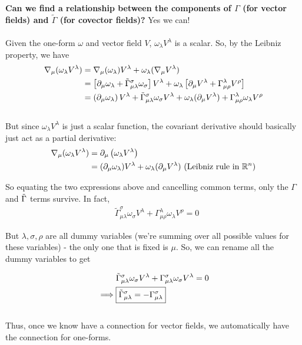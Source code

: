 \documentclass[11pt]{article}
\begin{document}
\vskip 0.5cm
\textbf{Can we find a relationship between the components of $\Gamma$ (for vector fields) and $\tilde{\Gamma}$ (for covector fields)?}
Yes we can! 
\\
\\
Given the one-form $\omega$ and vector field $V$, $\omega_{\lambda} V^{\lambda}$ is a scalar. So, by the Leibniz property, we have 
\begin{align*}
  \nabla_{\mu} (\omega_{\lambda} V^{\lambda}) &= \nabla_{\mu}(\omega_{\lambda}) V^{\lambda} + \omega_{\lambda} (\nabla_{\mu} V^{\lambda}) \\
  &= \left[ \partial_{\mu} \omega_{\lambda} + \Tilde{\Gamma}_{\mu \lambda}^{\sigma} \omega_{\sigma} \right] V^{\lambda} + \omega_{\lambda} \left[ \partial_{\mu} V^{\lambda} + \Gamma_{\mu \rho}^{\lambda} V^{\rho} \right] \\
  &= \left(\partial_{\mu} \omega_{\lambda}\right) V^{\lambda} + \Tilde{\Gamma}_{\mu \lambda}^{\sigma} \omega_{\sigma} V^{\lambda} + \omega_{\lambda} (\partial_{\mu} V^{\lambda} ) + \Gamma_{\mu \rho}^{\lambda}  \omega_{\lambda} V^{\rho} 
\end{align*}
\\
But since $\omega_{\lambda} V^{\lambda}$ is just a scalar function, the covariant derivative should basically just act as a partial derivative:
\begin{align*}
  \nabla_{\mu} (\omega_{\lambda} V^{\lambda}) &= \partial_{\mu} \left(\omega_{\lambda} V^{\lambda}\right) \\
  &= (\partial_{\mu} \omega_{\lambda}) V^{\lambda} + \omega_{\lambda} (\partial_{\mu} V^{\lambda}) \text{  (Leibniz rule in $\mathbb{R}^n$)} \\
\end{align*}

So equating the two expressions above and cancelling common terms, only the $\Gamma$ and $\Tilde{\Gamma}$ terms survive. In fact,
\begin{align*}
  &\tilde{\Gamma}_{\mu \lambda}^{\sigma} \omega_{\sigma} V^{\lambda} + \Gamma_{\mu \rho}^{\lambda}  \omega_{\lambda} V^{\rho} = 0 
\end{align*}

But $\lambda, \sigma, \rho$ are all dummy variables (we're summing over all possible values for these variables) - the only one that is fixed is $\mu$. So, we can rename all the dummy variables to get 

\begin{align*}
  &\Tilde{\Gamma}_{\mu \lambda}^{\sigma} \omega_{\sigma} V^{\lambda} + \Gamma_{\mu \lambda}^{\sigma} \omega_{\sigma} V^{\lambda} = 0\\ 
  \implies& \boxed{\Tilde{\Gamma}_{\mu \lambda}^{\sigma} = - \Gamma_{\mu \lambda}^{\sigma}}
\end{align*}
\\
Thus, once we know have a connection for vector fields, we automatically have the connection for one-forms.
\\
\\
\end{document}
